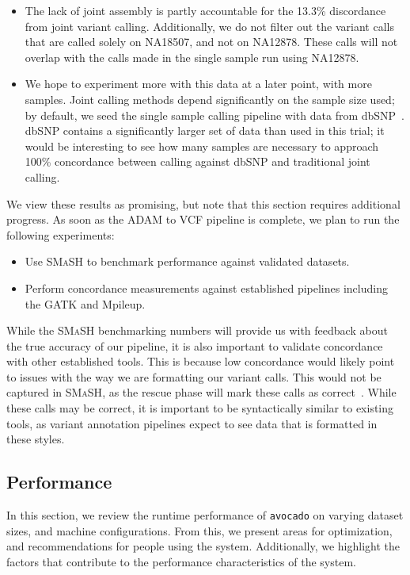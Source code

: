 \documentclass{acm_proc_article-sp}
\begin{document}
\begin{itemize}
\item The lack of joint assembly is partly accountable for the 13.3\% discordance from joint variant calling. Additionally, we do not filter out the
variant calls that are called solely on NA18507, and not on NA12878. These calls will not overlap with the calls made in the single sample
run using NA12878.
\item We hope to experiment more with this data at a later point, with more samples. Joint calling methods depend significantly on the sample
size used; by default, we seed the single sample calling pipeline with data from dbSNP~\cite{sherry01}. dbSNP contains a significantly larger
set of data than used in this trial; it would be interesting to see how many samples are necessary to approach 100\% concordance between
calling against dbSNP and traditional joint calling.
\end{itemize}

We view these results as promising, but note that this section requires additional progress. As soon as the ADAM to VCF pipeline is complete,
we plan to run the following experiments:

\begin{itemize}
\item Use \textsc{SMaSH} to benchmark performance against validated datasets.
\item Perform concordance measurements against established pipelines including the GATK and Mpileup.
\end{itemize}

While the \textsc{SMaSH} benchmarking numbers will provide us with feedback about the true accuracy of our pipeline, it is also important
to validate concordance with other established tools. This is because low concordance would likely point to issues with the way we are formatting
our variant calls. This would not be captured in \textsc{SMaSH}, as the rescue phase will mark these calls as correct~\cite{talwalkar13}. While
these calls may be correct, it is important to be syntactically similar to existing tools, as variant annotation pipelines expect to see data that
is formatted in these styles.

\subsection{Performance}
\label{sec:performance}


In this section, we review the runtime performance of \texttt{avocado} on varying dataset sizes, and machine configurations. From this,
we present areas for optimization, and recommendations for people using the system. Additionally, we highlight the factors that contribute
to the performance characteristics of the system.
\end{document}

